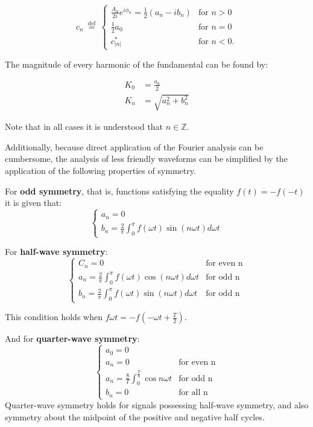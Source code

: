 \begin{equation}
c_n \ \stackrel{\mathrm{def}}{=} \ \begin{cases}
\frac{A_n}{2i} e^{i\phi_n} = \frac{1}{2}(a_n - i b_n) & \text{for } n > 0 \\
\frac{1}{2}a_0 & \text{for }n = 0\\
c_{|n|}^*  & \text{for } n < 0.
\end{cases}
\end{equation}


The magnitude of every harmonic of the fundamental can be found by:

\begin{align*}
K_0 &= \frac{a_0}{2} \\
K_n &= \sqrt{a_n^2+b_n^2}
\end{align*}

Note that in all cases it is understood that $n\in \mathbb{Z}$.

Additionally, because direct application of the Fourier analysis can be cumbersome, the analysis of less friendly waveforms can be simplified by the application of the following properties of symmetry.

For \textbf{odd symmetry}, that is, functions satisfying the equality $f(t)=-f(-t)$ it is given that:
\begin{equation}
\begin{cases}
a_n = 0 \\ 
b_n = \frac{2}{\pi}\int_{0}^{\pi}f(\omega t)\sin(n\omega t)d\omega t
\end{cases}
\end{equation}

For \textbf{half-wave symmetry}:
\begin{equation} 
\begin{cases} 
C_n = 0 &\mbox{for even n}  \\ 
a_n = \frac{2}{\pi}\int_{0}^{\pi}f(\omega t)\cos(n\omega t)d\omega t &\mbox{for odd n}  \\
b_n = \frac{2}{\pi}\int_{0}^{\pi}f(\omega t)\sin(n\omega t)d\omega t &\mbox{for odd n} 
\end{cases}
\end{equation}

This condition holds when $f{\omega t} = -f(-\omega t + \frac{T}{2})$.

And for \textbf{quarter-wave symmetry}:
\begin{equation} 
\begin{cases} 
a_0 = 0 \\
a_n = 0 &\mbox{for even n}  \\
a_n = \frac{8}{T}\int_{0}^{\frac{T}{4}}\cos{n\omega t} &\mbox{for odd n}  \\
b_n = 0 &\mbox{for all n} 
\end{cases}
\end{equation}
Quarter-wave symmetry holds for signals possessing half-wave symmetry, and also symmetry about the midpoint of the positive and negative half cycles.

